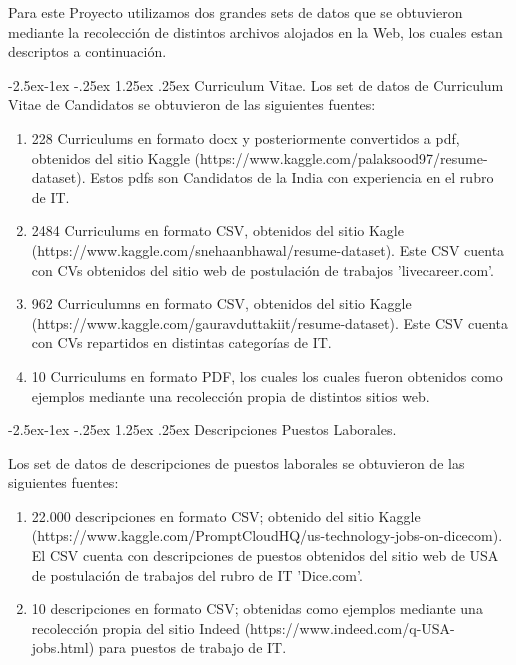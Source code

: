\documentclass[12pt,a4paper]{article}
\makeatletter
\renewcommand\paragraph{\@startsection{paragraph}{4}{\z@}
            {-2.5ex\@plus -1ex \@minus -.25ex}
            {1.25ex \@plus .25ex}
            {\normalfont\normalsize\bfseries}}
\makeatother
\begin{document}
Para este Proyecto utilizamos dos grandes sets de datos que se obtuvieron mediante la recolección de distintos archivos alojados en la Web, los cuales estan descriptos a continuación.

\paragraph{Curriculum Vitae.}
Los set de datos de Curriculum Vitae de Candidatos se obtuvieron de las siguientes fuentes:

\begin{enumerate}
\item 228 Curriculums en formato docx y posteriormente convertidos a pdf, obtenidos del sitio Kaggle (https://www.kaggle.com/palaksood97/resume-dataset). Estos pdfs son Candidatos de la India con experiencia en el rubro de IT.
\item 2484 Curriculums en formato CSV, obtenidos del sitio Kagle (https://www.kaggle.com/snehaanbhawal/resume-dataset). Este CSV cuenta con CVs obtenidos del sitio web de postulación de trabajos 'livecareer.com'.
\item 962 Curriculumns en formato CSV, obtenidos del sitio Kaggle (https://www.kaggle.com/gauravduttakiit/resume-dataset). Este CSV cuenta con CVs repartidos en distintas categorías de IT.
\item 10 Curriculums en formato PDF, los cuales los cuales fueron obtenidos como ejemplos mediante una recolección propia de distintos sitios web. 
\end{enumerate}

\paragraph{Descripciones Puestos Laborales.}

Los set de datos de descripciones de puestos laborales se obtuvieron de las siguientes fuentes:

\begin{enumerate}
\item 22.000 descripciones en formato CSV; obtenido del sitio Kaggle (https://www.kaggle.com/PromptCloudHQ/us-technology-jobs-on-dicecom). El CSV cuenta con descripciones de puestos obtenidos del sitio web de USA de postulación de trabajos del rubro de IT 'Dice.com'.
\item 10 descripciones en formato CSV; obtenidas como ejemplos mediante una recolección propia del sitio Indeed (https://www.indeed.com/q-USA-jobs.html) para puestos de trabajo de IT.
\end{enumerate}
 
\end{document}
